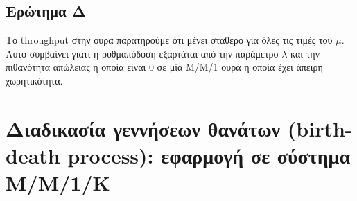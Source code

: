 \documentclass[12pt]{article}
\begin{document}
\subsection{Ερώτημα Δ}
Το throughput στην ουρα παρατηρούμε ότι μένει σταθερό για όλες τις τιμές του $\mu$.
Αυτό συμβαίνει γιατί η ρυθμαπόδοση εξαρτάται από την παράμετρο $\lambda$ και την 
πιθανότητα απώλειας η οποία είναι 0 σε μία Μ/Μ/1 ουρά η οποία έχει άπειρη χωρητικότητα.

\pagebreak

\section{Διαδικασία γεννήσεων θανάτων (birth-death process): εφαρμογή σε σύστημα
Μ/Μ/1/Κ}
\end{document}
